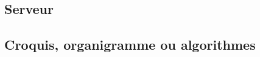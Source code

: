 \documentclass[12pt,french]{article}
\begin{document}












        \subsection{Serveur} %
        \label{sub:serveur}


        \subsection{Croquis, organigramme ou algorithmes} %
        \label{sub:croquis-org-algo}
\end{document}
